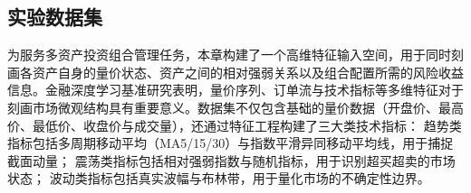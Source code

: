 \subsection{实验数据集}
为服务多资产投资组合管理任务，本章构建了一个高维特征输入空间，用于同时刻画各资产自身的量价状态、资产之间的相对强弱关系以及组合配置所需的风险收益信息。金融深度学习基准研究表明，量价序列、订单流与技术指标等多维特征对于刻画市场微观结构具有重要意义\cite{ntakaris2018benchmark}。数据集不仅包含基础的量价数据（开盘价、最高价、最低价、收盘价与成交量），还通过特征工程构建了三大类技术指标：
趋势类指标包括多周期移动平均（MA5/15/30）与指数平滑异同移动平均线，用于捕捉截面动量；
震荡类指标包括相对强弱指数与随机指标，用于识别超买超卖的市场状态；
波动类指标包括真实波幅与布林带，用于量化市场的不确定性边界。

